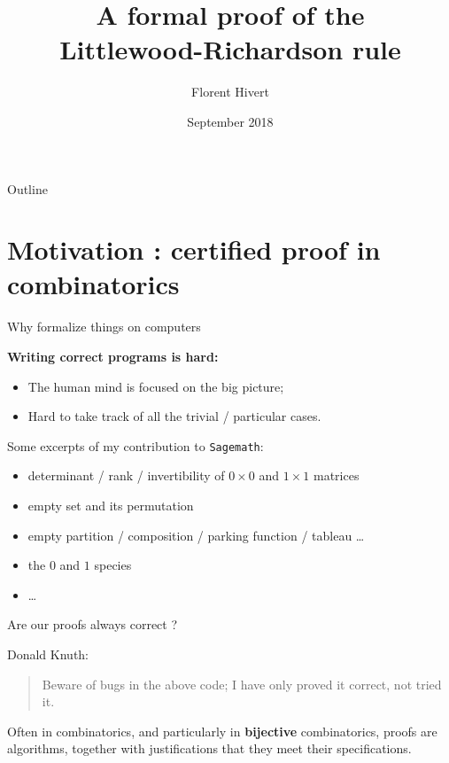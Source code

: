 \documentclass[compress,11pt]{beamer}
\title{\bf\LARGE A formal proof of the \\
Littlewood-Richardson rule\\[5mm]}
\author{Florent Hivert}
\institute[LRI]{
  LRI / Université Paris Sud 11 / CNRS}
\date[September 2018]{September 2018}
\begin{document}
\frame{\titlepage}

\begin{frame}{Outline}
  \tableofcontents
\end{frame}

\section{Motivation : certified proof in combinatorics}
\begin{frame}{Why formalize things on computers}

  \begin{center}
    \textbf{\LARGE Writing correct programs is hard:}
  \end{center}
\medskip

\begin{itemize}
\item The human mind is focused on the big picture;
\item Hard to take track of all the trivial / particular cases.
\end{itemize}
\bigskip\pause

Some excerpts of my contribution to \texttt{Sagemath}:
\begin{itemize}
\item determinant / rank / invertibility of $0\times0$ and $1\times1$ matrices
\item empty set and its permutation
\item empty partition / composition / parking function / tableau \dots
\item the $0$ and $1$ species
\item \dots
\end{itemize}
\bigskip\pause

\end{frame}

\begin{frame}{Are our proofs always correct ?}

Donald Knuth:
\begin{quote}
  Beware of bugs in the above code; I have only proved it correct, not tried it.
\end{quote}
\bigskip\pause

Often in combinatorics, and particularly in \textbf{bijective} combinatorics,
proofs are algorithms, together with justifications that they meet their
specifications.
\end{frame}
\end{document}
